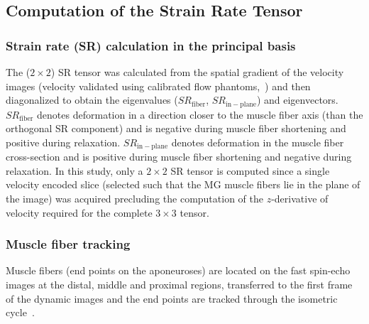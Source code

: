 \subsection{Computation of the Strain Rate Tensor }
\subsubsection{Strain rate (SR) calculation in the principal basis}
The ($2 \times 2$) SR tensor was calculated from the spatial gradient of the velocity images (velocity validated using calibrated flow phantoms,~\cite{RNSS11}) and then diagonalized to obtain the eigenvalues ($SR_\mathrm{fiber}$, $SR_\mathrm{in-plane}$) and eigenvectors. 
$SR_\mathrm{fiber}$ denotes deformation in a direction closer to the muscle fiber axis (than the orthogonal SR component) and is negative during muscle fiber shortening and positive during relaxation. 
$SR_\mathrm{in-plane}$ denotes deformation in the muscle fiber cross-section and is positive during muscle fiber shortening and negative during relaxation. 
In this study, only a $2 \times 2$ SR tensor is computed since a single velocity encoded slice (selected such that the MG muscle fibers lie in the plane of the image) was acquired precluding the computation of the $z$-derivative of velocity required for the complete $3 \times 3$ tensor.
\subsubsection{Muscle fiber tracking}
Muscle fibers (end points on the aponeuroses) are located on the fast spin-echo images at the distal, middle and proximal regions, transferred to the first frame of the dynamic images and the end points are tracked through the isometric cycle~\cite{RNS16}.
